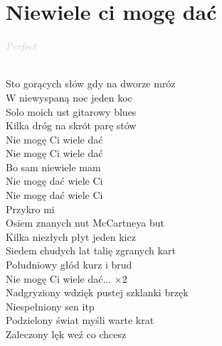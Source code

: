 \documentclass[a5paper, 10pt]{book}
\begin{document}
\section{Niewiele ci mogę dać}\textcolor{lightgray}{\textit{Perfect}}\\~\\
\begin{minipage}[t]{0.7\textwidth}
Sto gorących słów gdy na dworze mróz\\
W niewyspaną noc jeden koc\\
Solo moich ust gitarowy blues\\
Kilka dróg na skrót parę stów\\

\hspace*{5mm}Nie mogę Ci wiele dać\\
\hspace*{5mm}Nie mogę Ci wiele dać\\
\hspace*{5mm}Bo sam niewiele mam\\
\hspace*{5mm}Nie mogę dać wiele Ci\\
\hspace*{5mm}Nie mogę dać wiele Ci\\
\hspace*{5mm}Przykro mi\\

Osiem znanych nut McCartneya but\\
Kilka niezłych płyt jeden kicz\\
Siedem chudych lat talię zgranych kart\\
Południowy głód kurz i brud\\

\hspace*{5mm}Nie mogę Ci wiele dać... $\times 2$\\

Nadgryziony wdzięk pustej szklanki brzęk\\
Niespełniony sen itp\\
Podzielony świat myśli warte krat\\
Zaleczony lęk weź co chcesz\\
\end{minipage}
\end{document}
